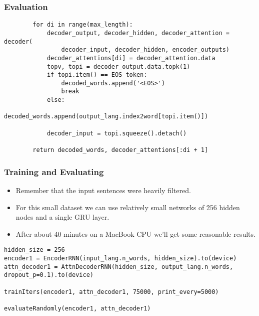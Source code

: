 \begin{frame}[fragile]
\frametitle{Evaluation}
\begin{lstlisting}    
        for di in range(max_length):
            decoder_output, decoder_hidden, decoder_attention = decoder(
                decoder_input, decoder_hidden, encoder_outputs)
            decoder_attentions[di] = decoder_attention.data
            topv, topi = decoder_output.data.topk(1)
            if topi.item() == EOS_token:
                decoded_words.append('<EOS>')
                break
            else:
                decoded_words.append(output_lang.index2word[topi.item()])

            decoder_input = topi.squeeze().detach()

        return decoded_words, decoder_attentions[:di + 1]
\end{lstlisting} 
              
\end{frame} 


\begin{frame}[fragile]
\frametitle{Training and Evaluating}
\begin{itemize}
\item Remember that the input sentences were heavily filtered. 
\item For this small dataset we can use relatively small networks of 256 hidden nodes and a single GRU layer.
\item After about 40 minutes on a MacBook CPU we’ll get some reasonable results.
\end{itemize}
\begin{lstlisting}    
hidden_size = 256
encoder1 = EncoderRNN(input_lang.n_words, hidden_size).to(device)
attn_decoder1 = AttnDecoderRNN(hidden_size, output_lang.n_words, dropout_p=0.1).to(device)

trainIters(encoder1, attn_decoder1, 75000, print_every=5000)

evaluateRandomly(encoder1, attn_decoder1)
\end{lstlisting}
              
\end{frame} 
